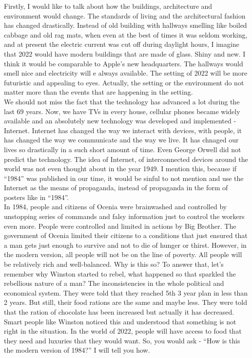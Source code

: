 \documentclass[a4paper,12pt]{article}
\begin{document}

Firstly, I would like to talk about how the buildings, architecture and environment would change. The standards of living and the architectural fashion has changed drastically. Instead of old building with hallways smelling like boiled cabbage and old rag mats, when even at the best of times it was seldom working, and at present the electric current was cut off during daylight hours, I imagine that 2022 would have modern buildings that are made of glass. Shiny and new. I think it would be comparable to Apple's new headquarters.\cite{apple} The hallways would smell nice and electricity will e always available. The setting of 2022 will be more futuristic and appealing to eyes. Actually, the setting or the environment do not matter more than the events that are happening in the setting. \\

We should not miss the fact that the technology has advanced a lot during the last 69 years. Now, we have TVs in every house, cellular phones became widely available and an absolutely new technology was developed and implemented - Internet. Internet has changed the way we interact with devices, with people, it has changed the way we communicate and the way we live. It has chnaged our lives so drastically in a such short amount of time. Even George Orwell did not predict the technology. The idea of Internet, of interconnected devices around the world was not even thought about in the year 1949. I mention this, because if ``1984'' was published in our time, it would be sinful to not mention and use the Internet as the means of propaganda, instead of propaganda in the form of posters like in ``1984''.\\



In 1984, people and citizens of Ocenia were brainwashed and controlled by unstopping series of commands and falsy information just to control the workers even more. People were controlled and limited in actions by Big Brother. The government of Ocenia limited their citizens to a conditions that just ensured that a man gets just enough to survive and not to die of hunger or thirst. However, in the modern version, all people will not be on the line of poverty. All people will be relatively rich and well-balanced. Why is this so? To answer that, let's remember why Winston started to rebel, what happened so that sparkled the rebellious nature of a man? The inconsistencies in the whole political and economical system. They were told that they reached 5th 3 year plan in less than 2 years. But still, their food rations are the same and maybe less. They were told that the ration of chocolate has been increased but actually it has decreased. Smart people like Winston noticed this and understood that something is not right in the situation. In the world of 2022, people will have access to food that they need and luxuries that they would want. So, you would ask - ``How is this the modern version of 1984?'' I will tell you how.\\
\end{document}
